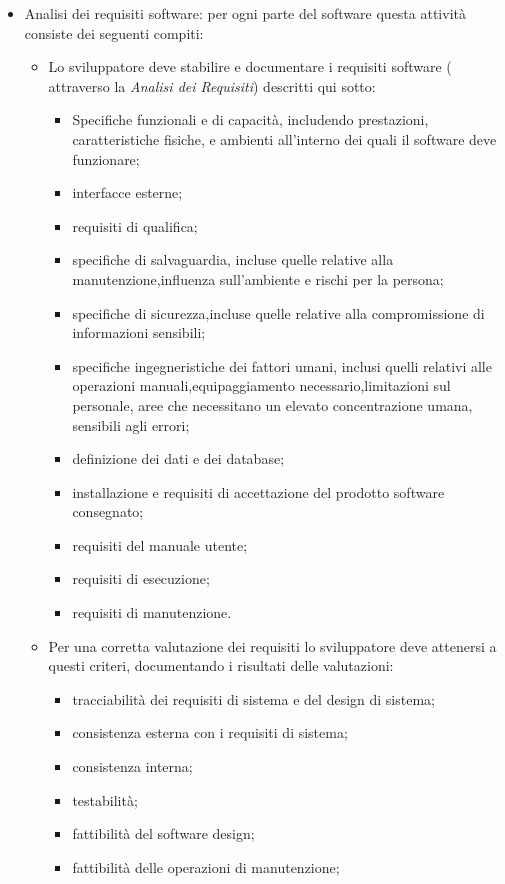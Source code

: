 			\begin{itemize}
			\item Analisi dei requisiti software: per ogni parte del software questa attività consiste dei seguenti compiti:
			\begin{itemize}
			\item Lo sviluppatore deve stabilire e documentare i requisiti software ( attraverso la \textit{Analisi dei Requisiti}) descritti qui sotto:
			\begin{itemize}
			\item Specifiche funzionali e di capacità, includendo prestazioni, caratteristiche fisiche, e ambienti all'interno dei quali il software deve funzionare;
			\item interfacce esterne;
			\item requisiti di qualifica;
			\item specifiche di salvaguardia, incluse quelle relative alla manutenzione,influenza sull'ambiente e rischi per la persona;
			\item specifiche di sicurezza,incluse quelle relative alla compromissione di informazioni sensibili;
			\item specifiche ingegneristiche dei fattori umani, inclusi quelli relativi alle operazioni manuali,equipaggiamento necessario,limitazioni sul personale, aree che necessitano un elevato concentrazione umana, sensibili agli errori;
			\item definizione dei dati e dei database;
			\item installazione e requisiti di accettazione del prodotto software consegnato; 
			\item requisiti del manuale utente;
			\item requisiti di esecuzione;
			\item requisiti di manutenzione.
			\end{itemize}
			\item Per una corretta valutazione dei requisiti lo sviluppatore deve attenersi a questi criteri, documentando i risultati delle valutazioni:
			\begin{itemize}
			\item tracciabilità dei requisiti di sistema e del design di sistema;
			\item consistenza esterna con i requisiti di sistema;
			\item consistenza interna;
			\item testabilità;
			\item fattibilità del software design;
			\item fattibilità delle operazioni di manutenzione;
			\end{itemize}
			\end{itemize}
			\end{itemize}
